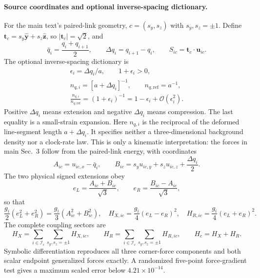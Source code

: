 \documentclass[10pt,aps,onecolumn,notitlepage,nofootinbib]{revtex4-2}
\newcommand{\vu}{\bm u}
\newcommand{\order}{\mathcal O}
\begin{document}
\paragraph*{Source coordinates and optional inverse-spacing dictionary.}
For the main text's paired-link geometry, $c=(s_y,s_z)$ with $s_y,s_z=\pm1$. Define $\bm t_c=s_y\hat{\bm y}+s_z\hat{\bm z}$, so $|\bm t_c|=\sqrt2$, and
\begin{equation}
 \bar q_i=\frac{q_i+q_{i+1}}{2},\qquad
 \Delta q_i=q_{i+1}-q_i,\qquad
 S_{ic}=\bm t_c\cdot\vu_{ic}.
\end{equation}
The optional inverse-spacing dictionary is
\begin{equation}
\begin{gathered}
  \epsilon_i=\Delta q_i/a,
  \qquad 1+\epsilon_i>0,\\
  n_{q,i}=[a+\Delta q_i]^{-1},
  \qquad n_{q,\mathrm{ref}}=a^{-1},\\
  \frac{n_{q,i}}{n_{q,\mathrm{ref}}}
  =(1+\epsilon_i)^{-1}
  =1-\epsilon_i+\order(\epsilon_i^2).
\end{gathered}
\label{eq:sm-inverse-spacing}
\end{equation}
Positive $\Delta q_i$ means extension and negative $\Delta q_i$ means compression. The last equality is a small-strain expansion. Here $n_{q,i}$ is the reciprocal of the deformed line-segment length $a+\Delta q_i$. It specifies neither a three-dimensional background density nor a clock-rate law. This is only a kinematic interpretation: the forces in main Sec.~3 follow from the paired-link energy, with coordinates
\begin{equation}
 A_{ic}=u_{ic,x}-\bar q_i,
 \qquad
 B_{ic}=s_yu_{ic,y}+s_zu_{ic,z}+\frac{\Delta q_i}{2}.
\end{equation}
The two physical signed extensions obey
\begin{equation}
 e_L=\frac{A_{ic}+B_{ic}}{\sqrt3},
 \qquad
 e_R=\frac{B_{ic}-A_{ic}}{\sqrt3},
\end{equation}
so that
\begin{equation}
 \frac{g_i}{2}(e_L^2+e_R^2)=\frac{g_i}{3}(A_{ic}^2+B_{ic}^2),
 \quad
 H_{X,ic}=\frac{g_i}{4}(e_L-e_R)^2,
 \quad
 H_{R,ic}=\frac{g_i}{4}(e_L+e_R)^2.
\end{equation}
The complete coupling sectors are
\begin{equation}
 H_X=\sum_{i\in\mathcal I_c}\sum_{s_y,s_z=\pm1}H_{X,ic},
 \qquad
 H_R=\sum_{i\in\mathcal I_c}\sum_{s_y,s_z=\pm1}H_{R,ic},
 \qquad H_c=H_X+H_R.
\end{equation}
Symbolic differentiation reproduces all three corner-force components and both scalar endpoint generalized forces exactly. A randomized five-point force-gradient test gives a maximum scaled error below $4.21\times10^{-14}$.
\end{document}
